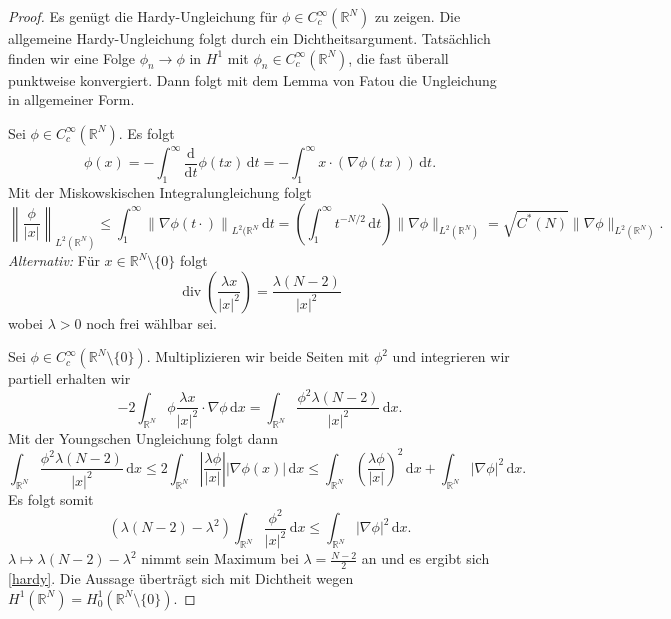 \documentclass[11pt,twoside,a4paper]{article}
\theoremstyle{break}
\begin{document}
\begin{proof}
Es genügt die Hardy-Ungleichung für $\phi\in C_c^\infty(\mathbb R^N)$ zu zeigen. Die allgemeine Hardy-Ungleichung folgt durch ein Dichtheitsargument.
Tatsächlich finden wir eine Folge $\phi_n\to \phi$ in $H^1$ mit $\phi_n \in C_c^\infty(\mathbb R^N)$, die fast überall punktweise konvergiert. Dann folgt mit dem Lemma von Fatou die Ungleichung in allgemeiner Form.

Sei $\phi \in C_c^\infty(\mathbb R^N)$. Es folgt
\begin{equation}
\phi(x)=-\int_1^\infty \frac{\mathrm d}{\mathrm dt} \phi(tx) \, \mathrm dt= - \int_1^\infty x \cdot (\nabla \phi(tx))\, \mathrm dt.
\end{equation}
Mit der Miskowskischen Integralungleichung folgt
\begin{equation}
\left \| \frac{\phi}{|x|} \right \|_{L^2(\mathbb R^N)} \le \int_1^\infty \left \| \nabla \phi(t\cdot) \right \|_{L^2(\mathbb R^N} \, \mathrm dt = \left ( \int_1^\infty t^{-N/2} \, \mathrm dt \right ) \|\nabla \phi\|_{L^2(\mathbb R^N)}=\sqrt{C^*(N)} \|\nabla\phi\|_{L^2(\mathbb R^N)}.
\end{equation}
{\it Alternativ:} Für $x\in \mathbb R^N\setminus\{0\}$ folgt
\begin{equation}
\operatorname{div} \left ( \frac{\lambda x}{|x|^2} \right ) = \frac{\lambda (N-2)}{|x|^2}
\end{equation}
wobei $\lambda>0$ noch frei wählbar sei. 

Sei $\phi \in C_c^\infty(\mathbb R^N\setminus \{0\})$. Multiplizieren wir beide Seiten mit $\phi^2$ und integrieren wir partiell erhalten wir 
\begin{equation}
-2\int_{\mathbb R^N} \phi \frac{\lambda x}{|x|^2} \cdot \nabla \phi \, \mathrm dx = \int_{\mathbb R^N} \frac{\phi^2\lambda (N-2)}{|x|^2}\, \mathrm dx.
\end{equation}
Mit der Youngschen Ungleichung folgt dann
\begin{equation}
\int_{\mathbb R^N} \frac{\phi^2\lambda (N-2)}{|x|^2} \, \mathrm dx \le 2 \int_{\mathbb R^N} \left | \frac{\lambda \phi}{|x|} \right | |\nabla \phi(x)|\, \mathrm dx \le \int_{\mathbb R^N} \left ( \frac{\lambda \phi}{|x|} \right )^2\, \mathrm dx + \int_{\mathbb R^N} |\nabla \phi|^2\, \mathrm dx.
\end{equation}
Es folgt somit
\begin{equation}
(\lambda(N-2) -\lambda^2)\int_{\mathbb R^N} \frac{\phi^2}{|x|^2}\, \mathrm dx \le \int_{\mathbb R^N} |\nabla \phi|^2\, \mathrm dx.
\end{equation}
$\lambda\mapsto \lambda(N-2)-\lambda^2$ nimmt sein Maximum bei $\lambda= \frac{N-2}{2}$ an und es ergibt sich \eqref{hardy}. Die Aussage überträgt sich mit Dichtheit wegen $H^1(\mathbb R^N) = H_0^1(\mathbb R^N\setminus\{0\})$.
\end{proof}
\end{document}
